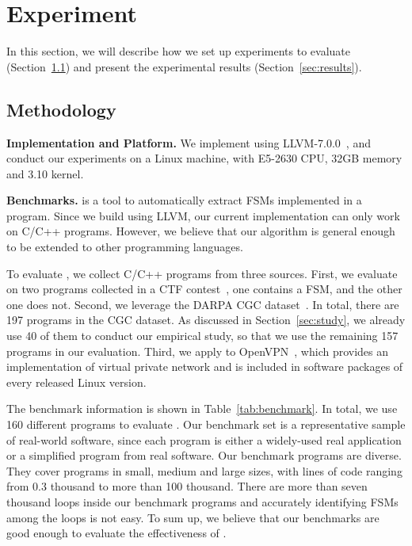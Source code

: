 \section{Experiment}
\label{sec:exp}

In this section, we will describe how we set up 
experiments to evaluate \Tool{} (Section~\ref{sec:meth}) 
and present the experimental results (Section~\ref{sec:results}). 

\subsection{Methodology}
\label{sec:meth}

\noindent\textbf{Implementation and Platform.} 
We implement \Tool{} using LLVM-7.0.0~\cite{LLVM}, 
and conduct our experiments on a Linux machine, 
with E5-2630 CPU, 32GB memory and 3.10 kernel. 

\noindent\textbf{Benchmarks.}
\Tool{} is a tool to automatically extract FSMs implemented in a program. 
Since we build \Tool{} using LLVM, 
our current implementation can only work on C/C++ programs.  
However, we believe that our algorithm is general enough 
to be extended to other programming languages. 


To evaluate \Tool{}, we collect C/C++ programs from three sources. 
First, we evaluate \Tool{} on two programs collected in a CTF contest~\cite{ctf}, 
one contains a FSM, and the other one does not. 
Second, we leverage the DARPA CGC dataset~\cite{CGC}. 
In total, there are 197 programs in the CGC dataset.
As discussed in Section~\ref{sec:study}, 
we already use 40 of them to conduct our empirical study,
so that we use the remaining 157 programs in our evaluation.
Third, we apply \Tool{} to OpenVPN~\cite{openvpn}, 
which provides an implementation of virtual private network and 
is included in software packages of every released Linux version. 



The benchmark information is shown in Table~\ref{tab:benchmark}.
In total, we use 160 different programs to evaluate \Tool{}.
Our benchmark set is a representative sample of real-world software, 
since each program is either a widely-used real application or a simplified program
from real software. 
Our benchmark programs are diverse. 
They cover programs in small, medium and large sizes, 
with lines of code ranging from 0.3 thousand to more than 100 thousand.  
There are more than seven thousand 
loops inside our benchmark programs and accurately 
identifying FSMs among the loops is not easy. 
To sum up, we believe that our benchmarks are good 
enough to evaluate the effectiveness of \Tool{}.


